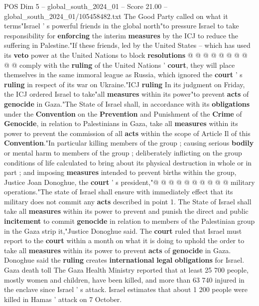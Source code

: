 \begin{textsample}{POS Dim 5 – global\_south\_2024\_01 – Score 21.00 – global\_south\_2024\_01/105458482.txt}
The Good Party called on what it terms"Israel ' s powerful friends in the global north"to pressure Israel to take responsibility for \textbf{enforcing} the interim \textbf{measures} by the ICJ to reduce the suffering in Palestine."If these friends, led by the United States -- which has used its \textbf{veto} power at the United Nations to block \textbf{resolutions} @ @ @ @ @ @ @ @ @ @ comply with the \textbf{ruling} of the United Nations ' \textbf{court}, they will place themselves in the same immoral league as Russia, which ignored the \textbf{court} ' s \textbf{ruling} in respect of its war on Ukraine."ICJ \textbf{ruling} In its judgment on Friday, the ICJ ordered Israel to take"all \textbf{measures} within its power"to prevent \textbf{acts} of \textbf{genocide} in Gaza."The State of Israel shall, in accordance with its \textbf{obligations} under the \textbf{Convention} on the \textbf{Prevention} and Punishment of the \textbf{Crime} of \textbf{Genocide}, in relation to Palestinians in Gaza, take all \textbf{measures} within its power to prevent the commission of all \textbf{acts} within the scope of Article Il of this \textbf{Convention}."In particular killing members of the group ; causing serious \textbf{bodily} or mental harm to members of the group ; deliberately inflicting on the group conditions of life calculated to bring about its physical destruction in whole or in part ; and imposing \textbf{measures} intended to prevent births within the group, Justice Joan Donoghue, the \textbf{court} ' s president,"@ @ @ @ @ @ @ @ @ @ military operations."The state of Israel shall ensure with immediately effect that its military does not commit any \textbf{acts} described in point 1.
The State of Israel shall take all \textbf{measures} within its power to prevent and punish the direct and public \textbf{incitement} to commit \textbf{genocide} in relation to members of the Palestinian group in the Gaza strip it,"Justice Donoghue said.
The \textbf{court} ruled that Israel must report to the \textbf{court} within a month on what it is doing to uphold the order to take all \textbf{measures} within its power to prevent \textbf{acts} of \textbf{genocide} in Gaza.
Donoghue said the \textbf{ruling} creates \textbf{international} \textbf{legal} \textbf{obligations} for Israel.
Gaza death toll The Gaza Health Ministry reported that at least 25 700 people, mostly women and children, have been killed, and more than 63 740 injured in the enclave since Israel ' s attack.
Israel estimates that about 1 200 people were killed in Hamas ' attack on 7 October.

\end{textsample}
